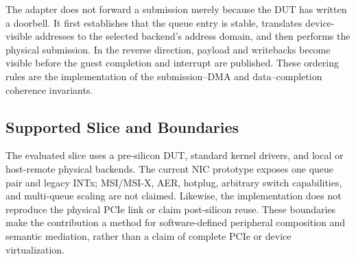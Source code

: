 The adapter does not forward a submission merely because the DUT has written a
doorbell. It first establishes that the queue entry is stable, translates
device-visible addresses to the selected backend's address domain, and then
performs the physical submission. In the reverse direction, payload and
writebacks become visible before the guest completion and interrupt are
published. These ordering rules are the implementation of the
submission--DMA and data--completion coherence invariants.

\subsection{Supported Slice and Boundaries}

The evaluated slice uses a pre-silicon DUT, standard kernel drivers, and local
or host-remote physical backends. The current NIC prototype exposes one queue
pair and legacy INTx; MSI/MSI-X, AER, hotplug, arbitrary switch capabilities,
and multi-queue scaling are not claimed. Likewise, the implementation does not
reproduce the physical PCIe link or claim post-silicon reuse. These boundaries
make the contribution a method for software-defined peripheral composition and
semantic mediation, rather than a claim of complete PCIe or device
virtualization.
